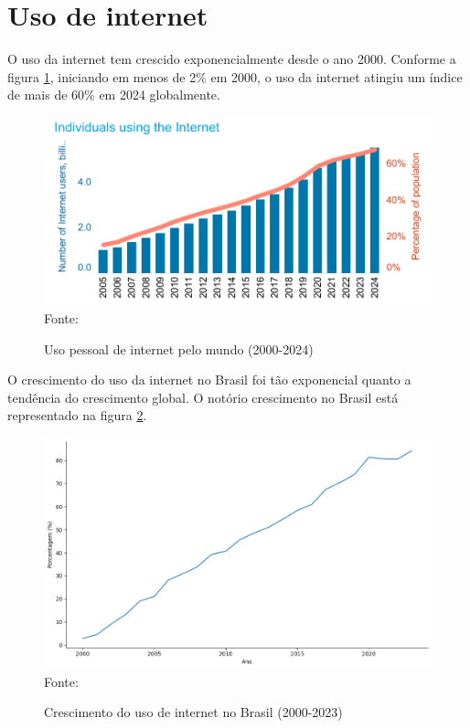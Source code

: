 \section{Uso de internet}

O uso da internet tem crescido exponencialmente desde o ano 2000. Conforme a figura \ref{fig:individuals_using_internet_itu}, iniciando em menos de 2\% em 2000, o uso da internet atingiu um índice de mais de 60\% em 2024 globalmente. 

\begin{figure}[ht]
    \centering
    \caption{Uso pessoal de internet pelo mundo (2000-2024)}
    \includegraphics[width=0.78\linewidth]{figuras/internet/individuals_using_internet_itu.png}
    \label{fig:individuals_using_internet_itu}
    \\ \footnotesize{Fonte: \cite{ITU_uso_internet_mundo}}
\end{figure}

O crescimento do uso da internet no Brasil foi tão exponencial quanto a tendência do crescimento global. O notório crescimento no Brasil está representado na figura \ref{fig:crescimento_internet_brasil_itu}.

\begin{figure}[ht]
    \centering
    \caption{Crescimento do uso de internet no Brasil (2000-2023)}
    \includegraphics[width=1\linewidth]{figuras/internet/lineplot_uso_internet_brasil_itu.png}
    \label{fig:crescimento_internet_brasil_itu}
    \footnotesize{Fonte: \cite{ITU_crescimento_uso_internet_brasil}}
\end{figure}

